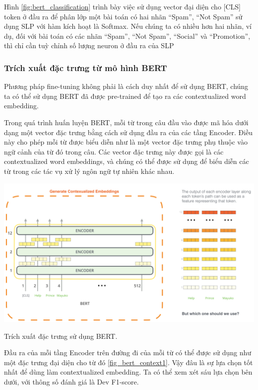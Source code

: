 \documentclass[a4paper, 12pt, openany]{book}
\begin{document}
Hình \ref{fig:bert_classification} trình bày việc sử dụng vector đại diện cho [CLS] token ở đầu ra để phân lớp
một bài toán có hai nhãn “Spam”, “Not Spam” sử dụng SLP với hàm kích hoạt là Softmax.
Nếu chúng ta có nhiều hơn hai nhãn, ví dụ, đối với bài toán có các nhãn “Spam”, “Not Spam”, “Social” và “Promotion”, thì chỉ cần tuỳ
chỉnh số lượng neuron ở đầu ra của SLP

\subsubsection{Trích xuất đặc trưng từ mô hình BERT}

Phương pháp fine-tuning không phải là cách duy nhất để sử dụng BERT, chúng ta
có thể sử dụng BERT đã được pre-trained để tạo ra các contextualized word embedding.

Trong quá trình huấn luyện BERT, mỗi từ trong câu đầu vào được mã hóa dưới dạng
một vector đặc trưng bằng cách sử dụng đầu ra của các tầng Encoder. Điều này cho phép
mỗi từ được biểu diễn như là một vector đặc trưng phụ thuộc vào ngữ cảnh của từ đó
trong câu. Các vector đặc trưng này được gọi là các contextualized word embeddings, và
chúng có thể được sử dụng để biểu diễn các từ trong các tác vụ xử lý ngôn ngữ tự nhiên
khác nhau.

\begin{minipage}{\linewidth}
    \captionsetup{type=figure}
    \centering
    \includegraphics[width=.8\linewidth]{./assets/images/BERT-context1.png}
    \caption{Trích xuất đặc trưng sử dụng BERT.}
    \label{fig:bert_context1}
\end{minipage}
\vspace{0.5cm}

Đầu ra của mỗi tầng Encoder trên đường đi của mỗi từ có thể được sử dụng như
một đặc trưng đại diện cho từ đó \ref{fig_bert_context1}. Vậy đâu là sự lựa chọn tốt nhất để dùng làm
contextualized embedding. Ta có thể xem xét sáu lựa chọn bên dưới, với thông số đánh giá là 
Dev F1-score.
\end{document}
